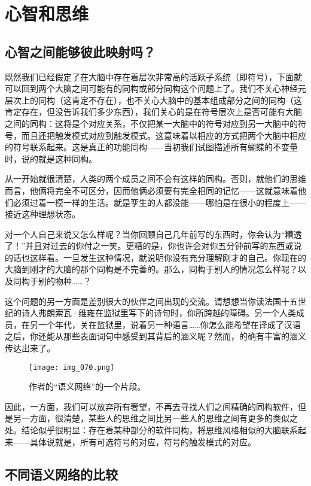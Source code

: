 
\chapter{心智和思维}

\section{心智之间能够彼此映射吗？}

既然我们已经假定了在大脑中存在着层次非常高的活跃子系统（即符号），下面就可以回到两个大脑之间可能有的同构或部分同构这个问题上了。我们不关心神经元层次上的同构（这肯定不存在），也不关心大脑中的基本组成部分之间的同构（这肯定存在，但没告诉我们多少东西），我们关心的是在符号层次上是否可能有大脑之间的同构：这将是个对应关系，不仅把某一大脑中的符号对应到另一大脑中的符号，而且还把触发模式对应到触发模式。这意味着以相应的方式把两个大脑中相应的符号联系起来。这是真正的功能同构——当初我们试图描述所有蝴蝶的不变量时，说的就是这种同构。

从一开始就很清楚，人类的两个成员之间不会有这样的同构。否则，就他们的思维而言，他俩将完全不可区分，因而他俩必须要有完全相同的记忆——这就意味着他们必须过着一模一样的生活。就是孪生的人都没能——哪怕是在很小的程度上——接近这种理想状态。

对一个人自己来说又怎么样呢？当你回顾自己几年前写的东西时，你会认为“糟透了！”并且对过去的你付之一笑。更糟的是，你也许会对你五分钟前写的东西或说的话也这样看。一旦发生这种情况，就说明你没有充分理解刚才的自己。你现在的大脑到刚才的大脑的那个同构是不完善的。那么，同构于别人的情况怎么样呢？以及同构于别的物种……？

这个问题的另一方面是差别很大的伙伴之间出现的交流。请想想当你读法国十五世纪的诗人弗朗索瓦·维雍在监狱里写下的诗句时，你所跨越的障碍。另一个人类成员，在另一个年代，关在监狱里，说着另一种语言……你怎么能希望在译成了汉语之后，你还能从那些表面词句中感受到其背后的涵义呢？然而，的确有丰富的涵义传达出来了。

\begin{figure}
\texttt{[image: img\_070.png]}
\caption[作者的“语义网络”的一个片段。]
  {作者的“语义网络”的一个片段。 }
\end{figure}

因此，一方面，我们可以放弃所有奢望，不再去寻找人们之间精确的同构软件，但是另一方面，很清楚，某些人的思维之间比另一些人的思维之间有更多的类似之处。结论似乎很明显：存在着某种部分的软件同构，将思维风格相似的大脑联系起来——具体说就是，所有可选符号的对应，符号的触发模式的对应。

\section{不同语义网络的比较}

